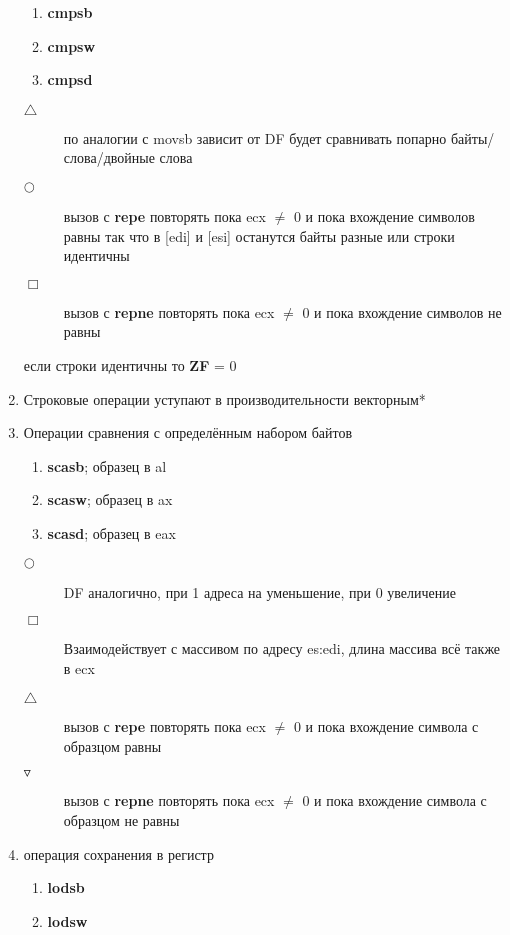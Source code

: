 \documentclass[a4paper, 12pt]{article}
\begin{document}
\begin{enumerate}
\begin{enumerate}
            \item \textbf{cmpsb}
            \item \textbf{cmpsw}
            \item \textbf{cmpsd}
        \end{enumerate}
        \begin{description}
            \item[$\triangle$] по аналогии с movsb зависит от DF будет сравнивать попарно байты/слова/двойные слова
            \item[$\bigcirc$] вызов с \textbf{repe} повторять пока ecx $\ne$ 0 и пока вхождение символов равны так что в [edi] и [esi] останутся байты разные или строки идентичны
            \item[$\Box$] вызов с \textbf{repne} повторять пока ecx $\ne$ 0 и пока вхождение символов не равны 
        \end{description}
        если строки идентичны то \textbf{ZF} = 0
        \item Строковые операции уступают в производительности векторным*
        \item Операции сравнения с определённым набором байтов
        \begin{enumerate}
            \item \textbf{scasb}; образец в al
            \item \textbf{scasw}; образец в ax
            \item \textbf{scasd}; образец в eax
        \end{enumerate}
        \begin{description}
            \item[$\bigcirc$] DF аналогично, при 1 адреса на уменьшение, при 0 увеличение
            \item[$\Box$] Взаимодействует с массивом по адресу es:edi, длина массива всё также в ecx 
            \item[$\triangle$] вызов с \textbf{repe} повторять пока ecx $\ne$ 0 и пока вхождение символа с образцом равны
            \item[$\triangledown$] вызов с \textbf{repne} повторять пока ecx $\ne$ 0 и пока вхождение символа с образцом не равны 
        \end{description}
        \item операция сохранения в регистр
        \begin{enumerate}
            \item \textbf{lodsb}
            \item \textbf{lodsw}

\end{enumerate}
\end{enumerate}
\end{document}
